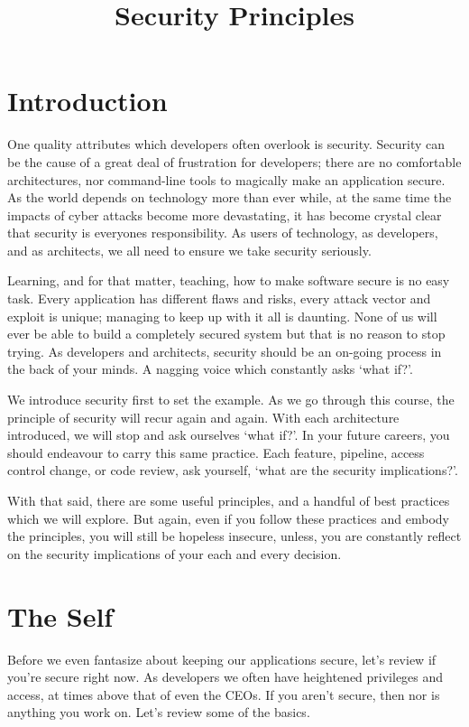 \title{Security Principles}
\maketitle

\section{Introduction}

One quality attributes which developers often overlook is security.
Security can be the cause of a great deal of frustration for developers;
there are no comfortable architectures, nor command-line tools to magically make an application secure.
As the world depends on technology more than ever while, at the same time the impacts of cyber attacks become more devastating,
it has become crystal clear that security is everyones responsibility.
As users of technology, as developers, and as architects, we all need to ensure we take security seriously.

Learning, and for that matter, teaching, how to make software secure is no easy task.
Every application has different flaws and risks, every attack vector and exploit is unique; managing to keep up with it all is daunting.
None of us will ever be able to build a completely secured system but that is no reason to stop trying.
As developers and architects, security should be an on-going process in the back of your minds.
A nagging voice which constantly asks `what if?'.

We introduce security first to set the example.
As we go through this course, the principle of security will recur again and again.
With each architecture introduced, we will stop and ask ourselves `what if?'.
In your future careers, you should endeavour to carry this same practice.
Each feature, pipeline, access control change, or code review, ask yourself, `what are the security implications?'.

With that said, there are some useful principles, and a handful of best practices which we will explore.
But again, even if you follow these practices and embody the principles,
you will still be hopeless insecure, unless,
you are constantly reflect on the security implications of your each and every decision.

\section{The Self}
Before we even fantasize about keeping our applications secure, let's review if you're secure right now.
As developers we often have heightened privileges and access, at times above that of even the CEOs.
If you aren't secure, then nor is anything you work on.
Let's review some of the basics.

